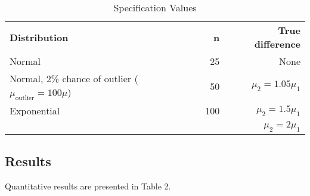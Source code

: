 \documentclass{report}
\begin{document}
\begin{table}[h]
	\caption{Specification Values}
	\vspace{1em}
	\centering
	\begin{tabular}{|l r r|}
		\hline
		\textbf{Distribution} & \textbf{n} & \textbf{True difference}\\
		Normal & 25 & None \\
		Normal, 2\% chance of outlier ($\mu_{\mathrm{outlier}}=100\mu$) & 50 & $\mu_2 = 1.05 \mu_1$ \\
		Exponential & 100 & $\mu_2 = 1.5 \mu_1$\\ 
		 &  & $\mu_2 = 2 \mu_1$\\ 
		\hline
	\end{tabular}
\end{table}

\subsection*{Results}

Quantitative results are presented in Table 2.
\end{document}
